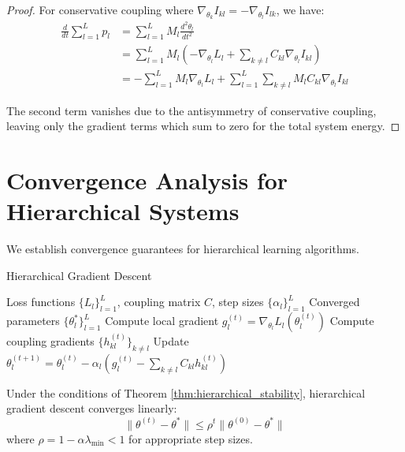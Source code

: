 \begin{proof}
For conservative coupling where $\nabla_{\theta_k} I_{kl} = -\nabla_{\theta_l} I_{lk}$, we have:
\begin{align}
\frac{d}{dt}\sum_{l=1}^L p_l &= \sum_{l=1}^L M_l \frac{d^2\theta_l}{dt^2} \\
&= \sum_{l=1}^L M_l \left(-\nabla_{\theta_l} L_l + \sum_{k \neq l} C_{kl} \nabla_{\theta_l} I_{kl}\right) \\
&= -\sum_{l=1}^L M_l \nabla_{\theta_l} L_l + \sum_{l=1}^L \sum_{k \neq l} M_l C_{kl} \nabla_{\theta_l} I_{kl}
\end{align}

The second term vanishes due to the antisymmetry of conservative coupling, leaving only the gradient terms which sum to zero for the total system energy.
\end{proof}

\section{Convergence Analysis for Hierarchical Systems}

We establish convergence guarantees for hierarchical learning algorithms.

\begin{algorithm}
\caption{Hierarchical Gradient Descent}
\begin{algorithmic}[1]
\Require Loss functions $\{L_l\}_{l=1}^L$, coupling matrix $C$, step sizes $\{\alpha_l\}_{l=1}^L$
\Ensure Converged parameters $\{\theta_l^*\}_{l=1}^L$
        \State Compute local gradient $g_l^{(t)} = \nabla_{\theta_l} L_l(\theta_l^{(t)})$
        \State Compute coupling gradients $\{h_{kl}^{(t)}\}_{k \neq l}$
        \State Update $\theta_l^{(t+1)} = \theta_l^{(t)} - \alpha_l\left(g_l^{(t)} - \sum_{k \neq l} C_{kl} h_{kl}^{(t)}\right)$
    \EndFor
\EndFor
\end{algorithmic}
\end{algorithm}

\begin{theorem}
\label{thm:hierarchical_convergence}
Under the conditions of Theorem \ref{thm:hierarchical_stability}, hierarchical gradient descent converges linearly:
$$\|\theta^{(t)} - \theta^*\| \leq \rho^t \|\theta^{(0)} - \theta^*\|$$
where $\rho = 1 - \alpha \lambda_{\min} < 1$ for appropriate step sizes.
\end{theorem}


